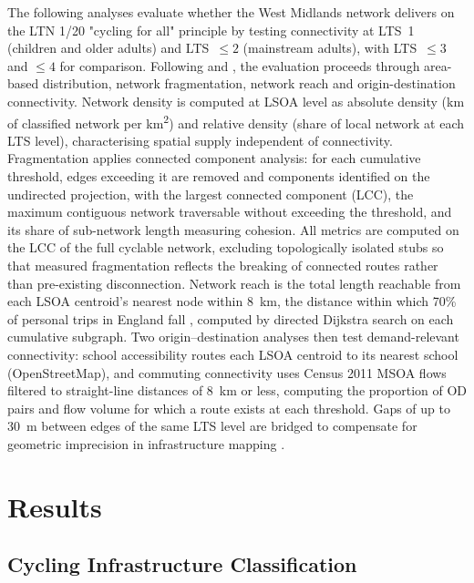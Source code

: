 \documentclass[final,5p,times,twocolumn,authoryear]{elsarticle}
\begin{document}
The following analyses evaluate whether the West Midlands network delivers on the LTN 1/20 "cycling for all" principle by testing connectivity at LTS~1 (children and older adults) and LTS~$\leq 2$ (mainstream adults), with LTS~$\leq 3$ and $\leq 4$ for comparison. Following \citet{viero2025} and \citet{schon2024}, the evaluation proceeds through area-based distribution, network fragmentation, network reach and origin-destination connectivity. Network density is computed at LSOA level as absolute density (km of classified network per km\textsuperscript{2}) and relative density (share of local network at each LTS level), characterising spatial supply independent of connectivity. Fragmentation applies connected component analysis: for each cumulative threshold, edges exceeding it are removed and components identified on the undirected projection, with the largest connected component (LCC), the maximum contiguous network traversable without exceeding the threshold, and its share of sub-network length measuring cohesion. All metrics are computed on the LCC of the full cyclable network, excluding topologically isolated stubs so that measured fragmentation reflects the breaking of connected routes rather than pre-existing disconnection. Network reach is the total length reachable from each LSOA centroid's nearest node within 8~km, the distance within which 70\% of personal trips in England fall \citep{departmentfortransport2025}, computed by directed Dijkstra search on each cumulative subgraph. Two origin--destination analyses then test demand-relevant connectivity: school accessibility routes each LSOA centroid to its nearest school (OpenStreetMap), and commuting connectivity uses Census 2011 MSOA flows filtered to straight-line distances of 8~km or less, computing the proportion of OD pairs and flow volume for which a route exists at each threshold. Gaps of up to 30~m between edges of the same LTS level are bridged to compensate for geometric imprecision in infrastructure mapping \citep{viero2025}.

\section{Results}
\label{sec:results}

\subsection{Cycling Infrastructure Classification}
\label{sec:facility}
\end{document}
